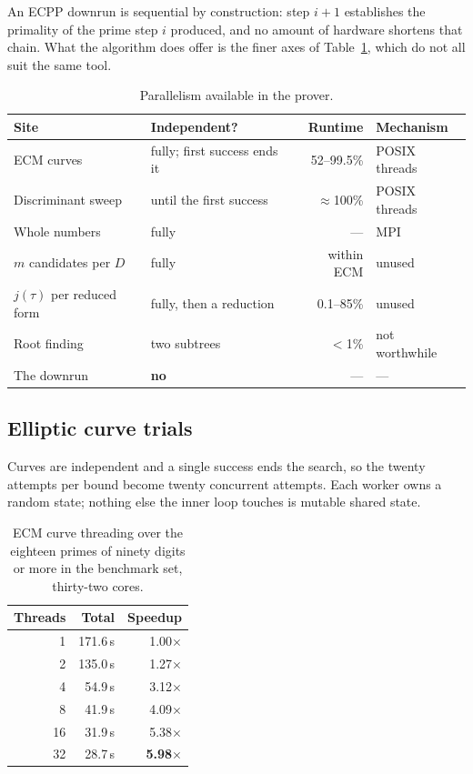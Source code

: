 \documentclass[11pt,a4paper]{article}
\begin{document}
An ECPP downrun is sequential by construction: step $i+1$ establishes the
primality of the prime step $i$ produced, and no amount of hardware
shortens that chain. What the algorithm does offer is the finer axes of
Table~\ref{tab:axes}, which do not all suit the same tool.

\begin{table}[t]
\centering
\begin{tabular}{llrl}
\toprule
Site & Independent? & Runtime & Mechanism \\
\midrule
ECM curves & fully; first success ends it & 52--99.5\% & POSIX threads \\
Discriminant sweep & until the first success & $\approx$100\% & POSIX threads \\
Whole numbers & fully & --- & MPI \\
$m$ candidates per $D$ & fully & within ECM & unused \\
$j(\tau)$ per reduced form & fully, then a reduction & 0.1--85\% & unused \\
Root finding & two subtrees & $<$1\% & not worthwhile \\
The downrun & \textbf{no} & --- & --- \\
\bottomrule
\end{tabular}
\caption{Parallelism available in the prover.}
\label{tab:axes}
\end{table}

\subsection{Elliptic curve trials}

Curves are independent and a single success ends the search, so the
twenty attempts per bound become twenty concurrent attempts. Each worker
owns a random state; nothing else the inner loop touches is mutable
shared state.

\begin{table}[t]
\centering
\begin{tabular}{rrr}
\toprule
Threads & Total & Speedup \\
\midrule
1  & 171.6\,s & 1.00$\times$ \\
2  & 135.0\,s & 1.27$\times$ \\
4  &  54.9\,s & 3.12$\times$ \\
8  &  41.9\,s & 4.09$\times$ \\
16 &  31.9\,s & 5.38$\times$ \\
32 &  28.7\,s & \textbf{5.98$\times$} \\
\bottomrule
\end{tabular}
\caption{ECM curve threading over the eighteen primes of ninety digits or
  more in the benchmark set, thirty-two cores.}
\label{tab:threads}
\end{table}
\end{document}

